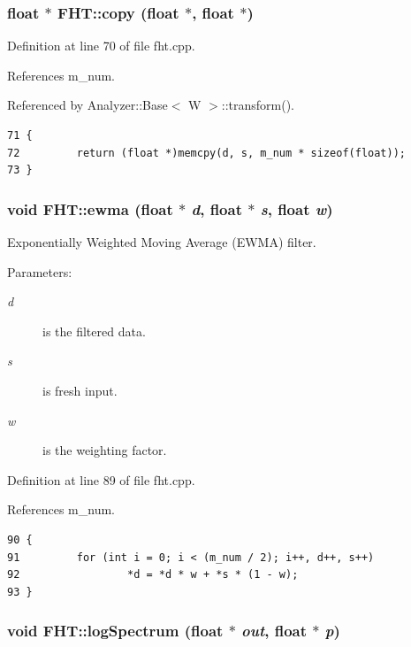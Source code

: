 \subsubsection{\setlength{\rightskip}{0pt plus 5cm}float $\ast$ FHT::copy (float $\ast$, float $\ast$)}\label{classFHT_FHTa4}




Definition at line 70 of file fht.cpp.

References m\_\-num.

Referenced by Analyzer::Base$<$ W $>$::transform().



\footnotesize\begin{verbatim}71 {
72         return (float *)memcpy(d, s, m_num * sizeof(float));
73 }
\end{verbatim}\normalsize 
{}
\subsubsection{\setlength{\rightskip}{0pt plus 5cm}void FHT::ewma (float $\ast$ {\em d}, float $\ast$ {\em s}, float {\em w})}\label{classFHT_FHTa7}


Exponentially Weighted Moving Average (EWMA) filter. \begin{Desc}
\item[Parameters:]
\begin{description}
\item[{\em d}]is the filtered data. \item[{\em s}]is fresh input. \item[{\em w}]is the weighting factor.\end{description}
\end{Desc}


Definition at line 89 of file fht.cpp.

References m\_\-num.



\footnotesize\begin{verbatim}90 {
91         for (int i = 0; i < (m_num / 2); i++, d++, s++)
92                 *d = *d * w + *s * (1 - w);
93 }
\end{verbatim}\normalsize 
{}
\subsubsection{\setlength{\rightskip}{0pt plus 5cm}void FHT::log\-Spectrum (float $\ast$ {\em out}, float $\ast$ {\em p})}\label{classFHT_FHTa9}


